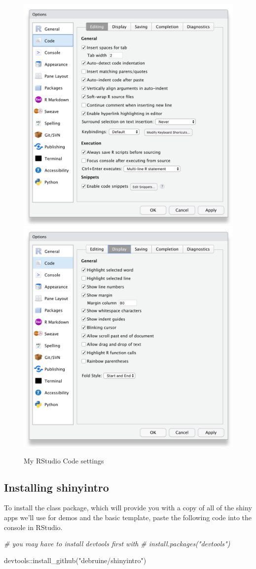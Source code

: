 \documentclass[
  oneside]{book}
\newenvironment{Shaded}{\begin{snugshade}}{\end{snugshade}}
\newcommand{\CommentTok}[1]{\textcolor[rgb]{0.56,0.35,0.01}{\textit{#1}}}
\newcommand{\FunctionTok}[1]{\textcolor[rgb]{0.00,0.00,0.00}{#1}}
\newcommand{\NormalTok}[1]{#1}
\newcommand{\SpecialCharTok}[1]{\textcolor[rgb]{0.00,0.00,0.00}{#1}}
\newcommand{\StringTok}[1]{\textcolor[rgb]{0.31,0.60,0.02}{#1}}
\begin{document}
\begin{figure}

{\centering \includegraphics[width=0.45\linewidth]{images/rstudio_settings_code_editing} \includegraphics[width=0.45\linewidth]{images/rstudio_settings_code_display} 

}

\caption{My RStudio Code settings}\label{fig:settings-code}
\end{figure}

\hypertarget{installing-shinyintro-1}{%
\subsection{Installing shinyintro}\label{installing-shinyintro-1}}

To install the class package, which will provide you with a copy of all of the shiny apps we'll use for demos and the basic template, paste the following code into the console in RStudio.

\begin{Shaded}
\begin{Highlighting}[]
\CommentTok{\# you may have to install devtools first with }
\CommentTok{\# install.packages("devtools")}

\NormalTok{devtools}\SpecialCharTok{::}\FunctionTok{install\_github}\NormalTok{(}\StringTok{"debruine/shinyintro"}\NormalTok{)}
\end{Highlighting}
\end{Shaded}
\end{document}
